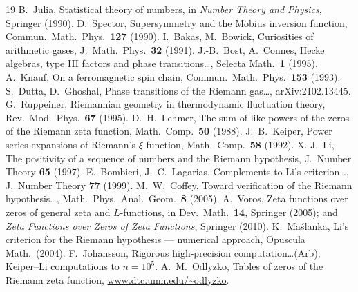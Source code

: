 \documentclass[11pt]{article}
\begin{document}
\begin{thebibliography}{19}
 B.~Julia, Statistical theory of numbers, in \emph{Number Theory and Physics}, Springer (1990).
 D.~Spector, Supersymmetry and the M\"obius inversion function, Commun.\ Math.\ Phys.\ \textbf{127} (1990).
 I.~Bakas, M.~Bowick, Curiosities of arithmetic gases, J.~Math.\ Phys.\ \textbf{32} (1991).
 J.-B.~Bost, A.~Connes, Hecke algebras, type III factors and phase transitions\ldots, Selecta Math.\ \textbf{1} (1995).
 A.~Knauf, On a ferromagnetic spin chain, Commun.\ Math.\ Phys.\ \textbf{153} (1993).
 S.~Dutta, D.~Ghoshal, Phase transitions of the Riemann gas\ldots, arXiv:2102.13445.
 G.~Ruppeiner, Riemannian geometry in thermodynamic fluctuation theory, Rev.\ Mod.\ Phys.\ \textbf{67} (1995).
 D.~H.~Lehmer, The sum of like powers of the zeros of the Riemann zeta function, Math.\ Comp.\ \textbf{50} (1988).
 J.~B.~Keiper, Power series expansions of Riemann's $\xi$ function, Math.\ Comp.\ \textbf{58} (1992).
 X.-J.~Li, The positivity of a sequence of numbers and the Riemann hypothesis, J.~Number Theory \textbf{65} (1997).
 E.~Bombieri, J.~C.~Lagarias, Complements to Li's criterion\ldots, J.~Number Theory \textbf{77} (1999).
 M.~W.~Coffey, Toward verification of the Riemann hypothesis\ldots, Math.\ Phys.\ Anal.\ Geom.\ \textbf{8} (2005).
 A.~Voros, Zeta functions over zeros of general zeta and $L$-functions, in Dev.\ Math.\ \textbf{14}, Springer (2005); and \emph{Zeta Functions over Zeros of Zeta Functions}, Springer (2010).
 K.~Ma\'slanka, Li's criterion for the Riemann hypothesis --- numerical approach, Opuscula Math.\ (2004).
 F.~Johansson, Rigorous high-precision computation\ldots (Arb); Keiper--Li computations to $n=10^5$.
 A.~M.~Odlyzko, Tables of zeros of the Riemann zeta function, \url{www.dtc.umn.edu/~odlyzko}.
\end{thebibliography}
\end{document}
